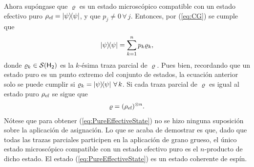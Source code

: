 Ahora supóngase que $\varrho$ es un estado microscópico compatible con un estado efectivo puro $\rho_{\ef}=\dyad{\psi}$, y que $p_{j}\neq 0\,\forall\,j$. Entonces, por (\ref{eq:CG}) se cumple que
\begin{equation}
    \dyad{\psi}=\sum_{k=1}^{n}p_{k}\varrho_{k},\nonumber
\end{equation}
donde $\varrho_{k}\in\mathcal{S}({\sf H}_{2})$ es la $k$-ésima traza parcial de $\varrho$. Pues bien, recordando que un estado puro es un punto extremo del conjunto de estados, la ecuación anterior solo se puede cumplir si $\varrho_{k}=\dyad{\psi}\,\forall\,k$.  Si cada traza parcial de $\varrho$ es igual al estado puro $\rho_{\text{ef}}$ se sigue que
\begin{equation}\label{eq:PureEffectiveState}
    \varrho=(\rho_{\text{ef}})^{\otimes n}.
\end{equation}
Nótese que para obtener (\ref{eq:PureEffectiveState}) no se hizo ninguna suposición sobre la aplicación de asignación. Lo que se acaba de demostrar es que, dado que todas las trazas parciales participen en la aplicación de grano grueso, el único estado microscópico compatible con un estado efectivo puro es el $n$-producto de dicho estado. El estado (\ref{eq:PureEffectiveState}) es un estado coherente de espín.
